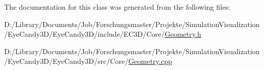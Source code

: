 The documentation for this class was generated from the following files\+:\begin{DoxyCompactItemize}
\item 
D\+:/\+Library/\+Documents/\+Job/\+Forschungsmaster/\+Projekte/\+Simulation\+Visualization/\+Eye\+Candy3\+D/\+Eye\+Candy3\+D/include/\+E\+C3\+D/\+Core/\mbox{\hyperlink{_geometry_8h}{Geometry.\+h}}\item 
D\+:/\+Library/\+Documents/\+Job/\+Forschungsmaster/\+Projekte/\+Simulation\+Visualization/\+Eye\+Candy3\+D/\+Eye\+Candy3\+D/src/\+Core/\mbox{\hyperlink{_geometry_8cpp}{Geometry.\+cpp}}\end{DoxyCompactItemize}
